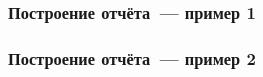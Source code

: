 \documentclass[hyperref={pdfpagelabels=false}]{beamer}
\begin{document}

\begin{frame}
\frametitle{Построение отчёта~--- пример 1}
\begin{figure}[H]
\end{figure}
\end{frame}

\begin{frame}
\frametitle{Построение отчёта~--- пример 2}
\begin{figure}[h]
\end{figure}
\end{frame}


\end{document}
